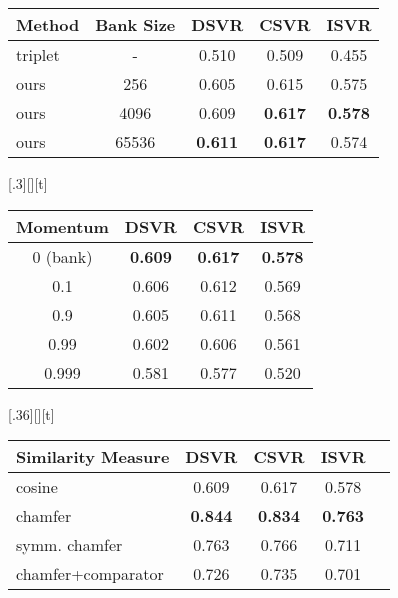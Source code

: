 \documentclass[10pt,twocolumn,letterpaper]{article}
\begin{document}
\begin{table*}[t]
{\begin{subfloatrow}
{\begin{tabular}{lcccc}
    Method  & Bank Size & DSVR              & CSVR              & ISVR   \\
    \toprule
    triplet & -         & 0.510             & 0.509             & 0.455 \\
    ours    & 256       & 0.605             & 0.615             & 0.575 \\    
    ours    & 4096      & 0.609             & \textbf{0.617}    & \textbf{0.578} \\
    ours    & 65536     & \textbf{0.611}    & \textbf{0.617}    & 0.574 \\ 
    \end{tabular}
}
[.3\textwidth][\FBheight][t]{\caption{\textbf{Momentum} (mAP on FIVR-5K)} \label{subtab:momentum}}{
    \centering
    \setlength{\tabcolsep}{2pt}
    \begin{tabular}{cccc}
    Momentum    & DSVR              & CSVR              & ISVR   \\
    \toprule
    0 (bank)    & \textbf{0.609}    & \textbf{0.617}    & \textbf{0.578} \\    
    0.1         & 0.606             & 0.612             & 0.569          \\
    0.9         & 0.605             & 0.611             & 0.568          \\ 
    0.99        & 0.602             & 0.606             & 0.561          \\ 
    0.999       & 0.581             & 0.577             & 0.520          \\
    \end{tabular}
}
[.36\textwidth][\FBheight][t]{\caption{\textbf{Similarity Measure} (mAP on FIVR-5K)} \label{subtab:simmeasure}}{
    \centering
    \setlength{\tabcolsep}{2pt}
    \begin{tabular}{lcccc}
    Similarity Measure  & DSVR              & CSVR              & ISVR   \\
    \toprule
    cosine              & 0.609          & 0.617          & 0.578          \\
    chamfer             & \textbf{0.844} & \textbf{0.834} & \textbf{0.763} \\
    symm. chamfer       & 0.763          & 0.766          & 0.711          \\
    chamfer+comparator  & 0.726          & 0.735          & 0.701          \\
    \end{tabular}
}
\end{subfloatrow}}
{\caption{\textbf{Ablations on FIVR about:} (a): Temporal context aggregation methods; (b): Frame feature representations; (c): Loss functions for contrastive learning (); (d) Size of the memory bank; (e) Momentum parameter of the queue of MoCo~\cite{he2019momentum}, degenerate to memory bank when set to 0; (f) Similarity measures (video-level and frame-level), comparator: the comparator network used in ~\cite{kordopatis2019visil}, with original parameters retained.} \label{tab:ablation}}
\end{table*}
\end{document}
